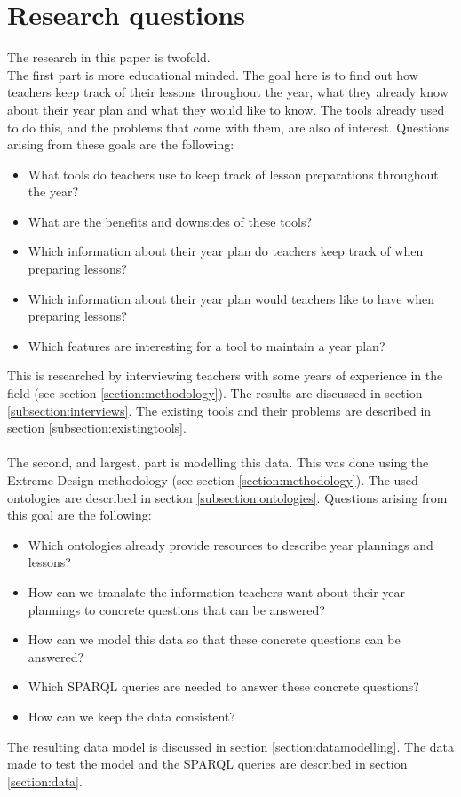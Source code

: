 \documentclass[a4paper]{report}
\begin{document}
    \section{Research questions}
    \label{subsection:questions}
    The research in this paper is twofold.\\
    The first part is more educational minded. The goal here is to find out how teachers keep track of their lessons throughout the year, what they already know about their year plan and what they would like to know.
    The tools already used to do this, and the problems that come with them, are also of interest. Questions arising from these goals are the following:  
    \begin{itemize}
        \item What tools do teachers use to keep track of lesson preparations throughout the year?
        \item What are the benefits and downsides of these tools?
        \item Which information about their year plan do teachers keep track of when preparing lessons?
        \item Which information about their year plan would teachers like to have when preparing lessons?
        \item Which features are interesting for a tool to maintain a year plan?
    \end{itemize}
    This is researched by interviewing teachers with some years of experience in the field (see section \ref{section:methodology}). The results are discussed in section \ref{subsection:interviews}. The existing tools and their problems are described in section \ref{subsection:existingtools}. \\ \\
    The second, and largest, part is modelling this data. This was done using the Extreme Design methodology\cite{xd} (see section \ref{section:methodology}). The used ontologies are described in section \ref{subsection:ontologies}.
    Questions arising from this goal are the following:
    \begin{itemize}
        \item Which ontologies already provide resources to describe year plannings and lessons?
        \item How can we translate the information teachers want about their year plannings to concrete questions that can be answered?
        \item How can we model this data so that these concrete questions can be answered?
        \item Which SPARQL queries are needed to answer these concrete questions?
        \item How can we keep the data consistent?
    \end{itemize}
    The resulting data model is discussed in section \ref{section:datamodelling}. The data made to test the model and the SPARQL queries are described in section \ref{section:data}.
\end{document}
